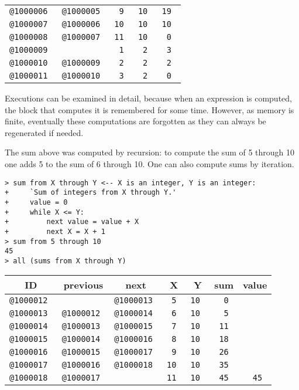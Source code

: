 \documentclass[12pt]{article}
\newenvironment{indpar}[1][0.3in]%
	{\begin{list}{}%
		     {\setlength{\itemsep}{0in}%
		      \setlength{\topsep}{0in}%
		      \setlength{\parsep}{1ex}%
		      \setlength{\labelwidth}{#1}%
		      \setlength{\leftmargin}{#1}%
		      \addtolength{\leftmargin}{\labelsep}}%
	 \item}%
	{\end{list}}
\begin{document}
\begin{indpar}
\begin{tabular}{|r|r|r|r|r|}
\tt @1000006 & \tt @1000005	& \tt 9		& \tt	10	& \tt 19 \\
\tt @1000007 & \tt @1000006	& \tt 10	& \tt	10	& \tt 10 \\
\tt @1000008 & \tt @1000007	& \tt 11	& \tt	10	& \tt 0 \\
\tt @1000009 &       		& \tt 1		& \tt	2	& \tt 3 \\
\tt @1000010 & \tt @1000009	& \tt 2		& \tt	2	& \tt 2 \\
\tt @1000011 & \tt @1000010	& \tt 3		& \tt	2	& \tt 0 \\
\hline
\end{tabular}
\end{indpar}

Executions can be examined in detail, because
when an expression is computed, the block that computes it is remembered
for some time.  However, as memory is finite, eventually these
computations are forgotten as they can always be regenerated if
needed.

The sum above was computed by recursion: to compute the sum of 5 through 10
one adds 5 to the sum of 6 through 10.  One can also compute sums by
iteration.

\begin{indpar}
\verb|> sum from X through Y <-- X is an integer, Y is an integer:| \\
\verb|+     `Sum of integers from X through Y.'| \\
\verb|+     value = 0| \\
\verb|+     while X <= Y:| \\
\verb|+         next value = value + X| \\
\verb|+         next X = X + 1| \\
\verb|> sum from 5 through 10| \\
\verb|45| \\
\verb|> all (sums from X through Y)| \\
\begin{tabular}{|r|r|r|r|r|r|r|}
\hline
\multicolumn{1}{|c}{\bf ID} &
\multicolumn{1}{|c}{\bf previous} &
\multicolumn{1}{|c}{\bf next} &
\multicolumn{1}{|c}{\bf X} &
\multicolumn{1}{|c}{\bf Y} &
\multicolumn{1}{|c}{\bf sum} &
\multicolumn{1}{|c|}{\bf value} \\
\hline
\tt @1000012 &              & \tt @1000013
	     & \tt 5	& \tt 10   & \tt 0	& \\
\tt @1000013 & \tt @1000012 & \tt @1000014
	     & \tt 6	& \tt 10   & \tt 5	& \\
\tt @1000014 & \tt @1000013 & \tt @1000015
	     & \tt 7	& \tt 10   & \tt 11	& \\
\tt @1000015 & \tt @1000014 & \tt @1000016
	     & \tt 8	& \tt 10   & \tt 18	& \\
\tt @1000016 & \tt @1000015 & \tt @1000017
	     & \tt 9	& \tt 10   & \tt 26	& \\
\tt @1000017 & \tt @1000016 & \tt @1000018
	     & \tt 10	& \tt 10   & \tt 35	& \\
\tt @1000018 & \tt @1000017 &
	     & \tt 11	& \tt 10   & \tt 45	& \tt 45 \\
\hline
\end{tabular}
\end{indpar}
\end{document}
